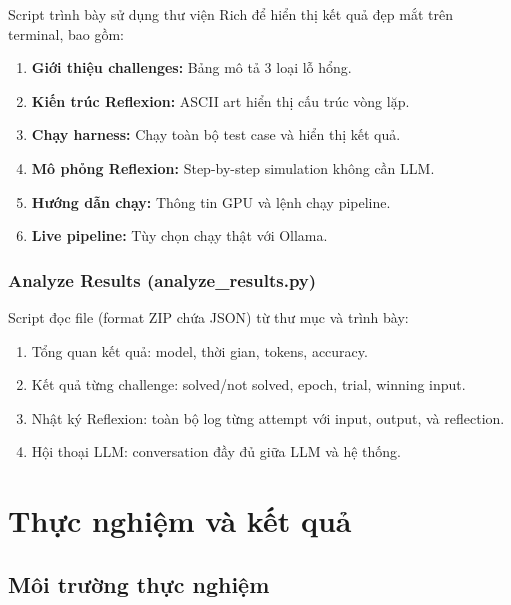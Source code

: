 \documentclass{nt521report}
\begin{document}
Script trình bày sử dụng thư viện Rich để hiển thị kết quả đẹp mắt trên terminal, bao gồm:

\begin{enumerate}
  \item \textbf{Giới thiệu challenges:} Bảng mô tả 3 loại lỗ hổng.
  \item \textbf{Kiến trúc Reflexion:} ASCII art hiển thị cấu trúc vòng lặp.
  \item \textbf{Chạy harness:} Chạy toàn bộ test case và hiển thị kết quả.
  \item \textbf{Mô phỏng Reflexion:} Step-by-step simulation không cần LLM.
  \item \textbf{Hướng dẫn chạy:} Thông tin GPU và lệnh chạy pipeline.
  \item \textbf{Live pipeline:} Tùy chọn chạy thật với Ollama.
\end{enumerate}

\subsection{Analyze Results (analyze\_results.py)}

Script đọc file  (format ZIP chứa JSON) từ thư mục  và trình bày:

\begin{enumerate}
  \item Tổng quan kết quả: model, thời gian, tokens, accuracy.
  \item Kết quả từng challenge: solved/not solved, epoch, trial, winning input.
  \item Nhật ký Reflexion: toàn bộ log từng attempt với input, output, và reflection.
  \item Hội thoại LLM: conversation đầy đủ giữa LLM và hệ thống.
\end{enumerate}


\chapter{Thực nghiệm và kết quả}
\label{chap:experiment}

\section{Môi trường thực nghiệm}
\label{sec:experiment-env}
\end{document}
